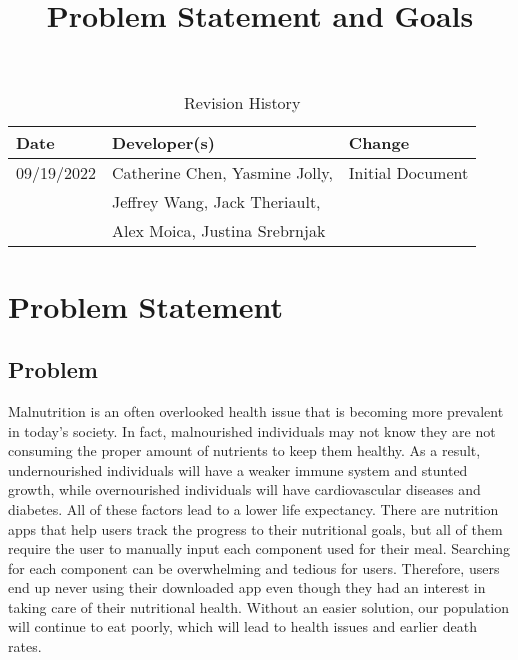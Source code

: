\documentclass{article}
\title{Problem Statement and Goals\\\progname}
\author{\authname}
\date{}
\begin{document}
\maketitle

\begin{table}[hp]
\caption{Revision History} \label{TblRevisionHistory}
\begin{tabularx}{\textwidth}{llX}
\toprule
\textbf{Date} & \textbf{Developer(s)} & \textbf{Change}\\
\midrule
09/19/2022 & Catherine Chen, Yasmine Jolly, &Initial Document\\ 
&Jeffrey Wang, Jack Theriault, &\\
&Alex Moica, Justina Srebrnjak &\\
\bottomrule
\end{tabularx}
\end{table}

\newpage

\section{Problem Statement}


\subsection{Problem}

Malnutrition is an often overlooked health issue that is becoming more prevalent in today's society. In fact, malnourished individuals may not know they are not consuming the proper amount of nutrients to keep them healthy. As a result, undernourished individuals will have a weaker immune system and stunted growth, while overnourished individuals will have cardiovascular diseases and diabetes. All of these factors lead to a lower life expectancy. There are nutrition apps that help users track the progress to their nutritional goals, but all of them require the user to manually input each component used for their meal. Searching for each component can be overwhelming and tedious for users. Therefore, users end up never using their downloaded app even though they had an interest in taking care of their nutritional health. Without an easier solution, our population will continue to eat poorly, which will lead to health issues and earlier death rates.
\end{document}
